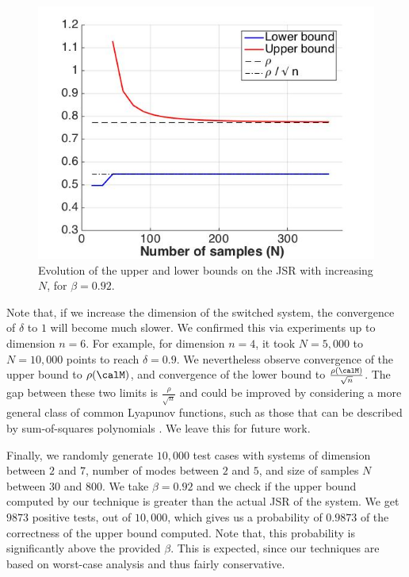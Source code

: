 \begin{figure}
\begin{center}
\includegraphics[trim = 5mm 5mm 5mm 5mm,scale=0.35]{bounds1.jpg}

\caption{Evolution of the upper and lower bounds on the JSR with increasing $N$, for $\beta=0.92$.}
\label{fig:21}
\end{center}
\end{figure}

Note that, if we increase the dimension of the switched system, the convergence of $\delta$ to $1$ will become much slower. We confirmed this via experiments up to dimension $n=6$. For example, for dimension $n=4$, it took $N=5,000$ to $N=10,000$ points to reach $\delta = 0.9$. We nevertheless observe convergence of the upper bound to $\rho(\calM)$, and convergence of the lower bound to $\frac{\rho(\calM)}{\sqrt{n}}$. The gap between these two limits is $\frac{\rho}{\sqrt{n}}$ and could be improved by considering a more general class of common Lyapunov functions, such as those that can be described by sum-of-squares polynomials \cite{sosLyap}. We leave this for future work.

Finally, we randomly generate $10,000$ test cases with systems of dimension between $2$ and $7$, number of modes between $2$ and $5$, and size of samples $N$ between $30$ and $800$. We take $\beta = 0.92$ and we check if the upper bound computed by our technique is greater than the actual JSR of the system. We get $9873$ positive tests, out of $10,000$, which gives us a probability of $0.9873$ of the correctness of the upper bound computed. Note that, this probability is significantly above the provided $\beta$. This is expected, since our techniques are based on worst-case analysis and thus fairly conservative.